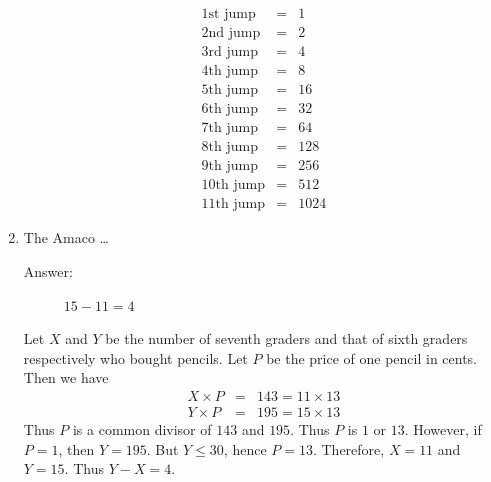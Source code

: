 \documentclass{article}
\begin{document}
\begin{enumerate}
\begin{solution}
\begin{eqnarray*}
1\mbox{st jump} &=& 1
\\
2\mbox{nd jump} &=& 2
\\
3\mbox{rd jump} &=& 4
\\
4\mbox{th jump} &=& 8
\\
5\mbox{th jump} &=& 16
\\
6\mbox{th jump} &=& 32
\\
7\mbox{th jump} &=& 64
\\
8\mbox{th jump} &=& 128
\\
9\mbox{th jump} &=& 256
\\
10\mbox{th jump} &=& 512
\\
11\mbox{th jump} &=& 1024
\end{eqnarray*}
\end{solution}


\item The Amaco \ldots\\

\begin{description}
\item[Answer:] $15 - 11 = 4$
\end{description}

\begin{solution}
Let $X$ and $Y$ be the number of seventh graders and that of sixth graders
respectively who bought pencils.
Let $P$ be the price of one pencil in cents.
Then we have
\begin{eqnarray*}
X \times P &=& 143 = 11 \times 13
\\
Y \times P &=& 195 = 15 \times 13
\end{eqnarray*}
Thus $P$ is a common divisor of $143$ and $195$.
Thus $P$ is $1$ or $13$. However, if $P=1$, then $Y=195$. But $Y\leq 30$, hence $P=13$.
Therefore, $X=11$ and $Y=15$.
Thus $Y-X = 4$.
\end{solution}

\end{enumerate}
\end{document}
